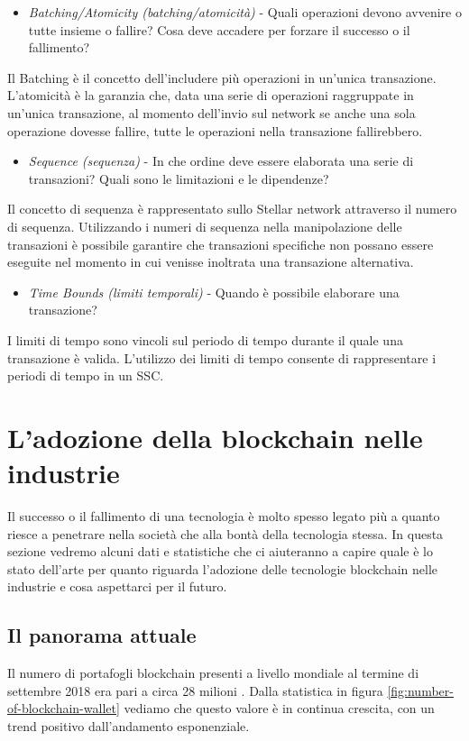 \begin{itemize}
	\item \textit{Batching/Atomicity (batching/atomicità)} -
	      Quali operazioni devono avvenire
	      o tutte insieme o fallire?
	      Cosa deve accadere per forzare il successo o il fallimento?
\end{itemize}
Il Batching è il concetto dell'includere più operazioni in un'unica transazione.
L'atomicità è la garanzia che, data una serie di operazioni raggruppate in
un'unica transazione,
al momento dell'invio sul network se anche una sola operazione dovesse fallire,
tutte le operazioni nella transazione fallirebbero.

\begin{itemize}
	\item \textit{Sequence (sequenza)} -
	      In che ordine deve essere elaborata una serie di transazioni?
	      Quali sono le limitazioni e le dipendenze?
\end{itemize}
Il concetto di sequenza è rappresentato sullo Stellar network attraverso
il numero di sequenza. Utilizzando i numeri di sequenza
nella manipolazione delle transazioni è possibile garantire che
transazioni specifiche non possano essere eseguite
nel momento in cui venisse inoltrata una transazione alternativa.

\begin{itemize}
	\item \textit{Time Bounds (limiti temporali)} -
	      Quando è possibile elaborare una transazione?
\end{itemize}
I limiti di tempo sono vincoli sul periodo di tempo durante il quale
una transazione è valida. L'utilizzo dei limiti di tempo
consente di rappresentare i periodi di tempo in un SSC.

\section{L'adozione della blockchain nelle industrie}
Il successo o il fallimento di una tecnologia è molto spesso legato più a quanto riesce a penetrare
nella società che alla bontà della tecnologia stessa.
In questa sezione vedremo alcuni dati e statistiche che ci aiuteranno a capire quale è
lo stato dell'arte per quanto riguarda l'adozione delle tecnologie blockchain nelle industrie
e cosa aspettarci per il futuro.

\subsection{Il panorama attuale}
Il numero di portafogli blockchain presenti a livello mondiale al termine di settembre 2018
era pari a circa 28 milioni \cite{number-of-blockchain-wallet}.
Dalla statistica in figura \ref{fig:number-of-blockchain-wallet} vediamo che questo valore è in continua crescita,
con un trend positivo dall'andamento esponenziale.

